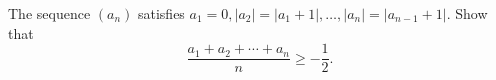 The sequence $(a_n)$ satisfies $a_1 = 0, |a_2| = |a_1 + 1|, \ldots, |a_n| = |a_{n-1} + 1|$. Show that
\[
\frac{a_1 + a_2 + \cdots + a_n}{n} \geq -\frac{1}{2}.
\]
